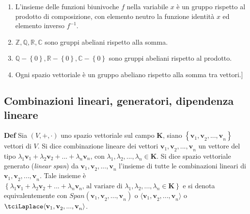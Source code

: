 \documentclass{article}
\begin{document}
\begin{enumerate}
\item L'insieme delle funzioni biunivoche $f$ nella variabile $x$ \`{e} un
gruppo rispetto al prodotto di composizione, con elemento neutro la funzione
identit\`{a} $x$ ed elemento inverso $f^{-1}$.

\item $%
\mathbb{Z}
,%
\mathbb{Q}
,%
\mathbb{R}
,%
\mathbb{C}
$ sono gruppi abeliani rispetto alla somma.

\item $%
\mathbb{Q}
-\left\{ 0\right\} ,%
\mathbb{R}
-\left\{ 0\right\} ,%
\mathbb{C}
-\left\{ 0\right\} $ sono gruppi abeliani rispetto al prodotto.

\item Ogni spazio vettoriale \`{e} un gruppo abeliano rispetto alla somma
tra vettori.]
\end{enumerate}

\subsection{Combinazioni lineari, generatori, dipendenza lineare}

\textbf{Def} Sia $\left( V,+,\cdot \right) $ uno spazio vettoriale sul campo 
$\mathbf{K}$, siano $\left\{ \mathbf{v}_{1}\mathbf{,v}_{2}\mathbf{,...,v}%
_{n}\right\} $ vettori di $V$. Si dice combinazione lineare dei vettori $%
\mathbf{v}_{1}\mathbf{,v}_{2}\mathbf{,...,v}_{n}$ un vettore del tipo $%
\lambda _{1}\mathbf{v}_{1}+\lambda _{2}\mathbf{v}_{2}+...+\lambda _{n}%
\mathbf{v}_{n}$, con $\lambda _{1},\lambda _{2},...,\lambda _{n}\in \mathbf{K%
}$. Si dice spazio vettoriale generato (\textit{linear span}) da $\mathbf{v}%
_{1}\mathbf{,v}_{2}\mathbf{,...,v}_{n}$ l'insieme di tutte le combinazioni
lineari di $\mathbf{v}_{1}\mathbf{,v}_{2}\mathbf{,...,v}_{n}$. Tale insieme 
\`{e} $\left\{ \lambda _{1}\mathbf{v}_{1}+\lambda _{2}\mathbf{v}%
_{2}+...+\lambda _{n}\mathbf{v}_{n}\text{, al variare di }\lambda
_{1},\lambda _{2},...,\lambda _{n}\in \mathbf{K}\right\} $ e si denota
equivalentemente con $Span\left( \mathbf{v}_{1}\mathbf{,v}_{2}\mathbf{,...,v}%
_{n}\right) $ o $\langle \mathbf{v}_{1}\mathbf{,v}_{2}\mathbf{,...,v}%
_{n}\rangle $ o $\tciLaplace \langle \mathbf{v}_{1}\mathbf{,v}_{2}\mathbf{%
,...,v}_{n}\rangle $.
\end{document}
